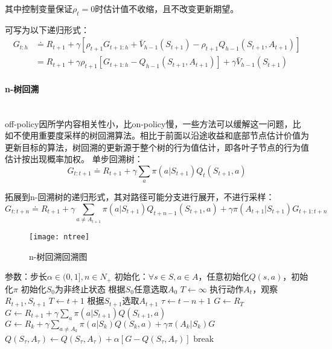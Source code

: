 \documentclass[
12pt, %
a4paper, 
oneside, %
headinclude,footinclude, %
]{scrartcl}
\begin{document}
其中控制变量保证$ \rho_t = 0 $时估计值不收缩，且不改变更新期望。

可写为以下递归形式：
\begin{align*}
G_{t:h} 
&\doteq R_{t + 1} + \gamma[\rho_{t + 1} G_{t + 1:h} + \bar{V}_{h - 1}(S_{t + 1}) - \rho_{t + 1} Q_{h - 1}(S_{t + 1}, A_{t + 1})] \\
&= R_{t + 1} + \gamma \rho_{t + 1}[G_{t + 1:h} - Q_{h - 1}(S_{t + 1}, A_{t + 1})] + \gamma \bar{V}_{h - 1}(S_{t + 1})
\end{align*}
\paragraph{n-树回溯}~\\

off-policy因所学内容相关性小，比on-policy慢，一些方法可以缓解这一问题，比如不使用重要度采样的树回溯算法。相比于前面以沿途收益和底部节点估计价值为更新目标的算法，树回溯的更新源于整个树的行为值估计，即各叶子节点的行为值估计按出现概率加权。
单步回溯树：
$$ G_{t:t + 1} \doteq R_{t + 1} + \gamma \sum_{a} \pi(a|S_{t + 1}) Q_t(S_{t + 1}, a) $$

拓展到n-回溯树的递归形式，其对路径可能分支进行展开，不进行采样：
$$ G_{t:t + n} \doteq R_{t + 1} + \gamma \sum_{a \neq A_{t + 1}} \pi(a|S_{t + 1}) Q_{t + n - 1}(S_{t + 1}, a) + \gamma \pi(A_{t + 1}|S_{t + 1}) G_{t + 1:t + n} $$

\begin{figure}[H]
\centering
\texttt{[image: ntree]}
\caption[n-树回溯回溯图]{n-树回溯回溯图}
\end{figure}
\begin{myalgorithm}[n-树回溯]
\State 参数：步长$ \alpha \in (0,1], n \in N_+ $
\State 初始化：$ \forall s \in S, a \in A $，任意初始化$ Q(s, a) $，初始化$ \pi $
\State 初始化$ S_0 $为非终止状态
\State 根据$ S_0 $任意选取$ A_0 $
\State $ T \gets \infty $
\State 执行动作$ A_t $，观察$ R_{t + 1},S_{t + 1} $
\State $ T \gets t + 1 $
\Else
\State 根据$ S_{t + 1} $选取$ A_{t + 1} $
\EndIf
\EndIf
\State $ \tau \gets t - n + 1 $ 
\State $ G \gets R_T $ 
\Else
\State $ G \gets R_{t + 1} + \gamma \sum_a \pi(a|S_{t + 1})Q(S_{t + 1}, a) $
\EndIf
{}
\State $ G \gets R_k + \gamma \sum_{a \neq A_k} \pi(a|S_k)Q(S_k,a) + \gamma \pi(A_k|S_k)G $
\EndFor
\State $ Q(S_{\tau}, A_{\tau}) \gets Q(S_{\tau}, A_{\tau}) + \alpha[G - Q(S_{\tau}, A_{\tau})] $
\EndIf
{}
\State break
\EndIf
\EndFor
\EndFor
\end{myalgorithm}
\end{document}

